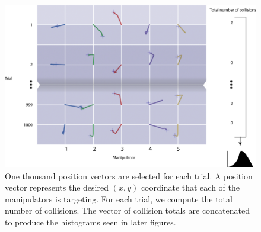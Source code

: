 \documentclass[9pt,twocolumn,twoside]{pnas-new}
\begin{document}
\begin{figure}
\centering
\includegraphics[width=11.4cm]{trial_explanation}
\caption{One thousand position vectors are selected for each trial. A position vector represents the desired $(x,y)$ coordinate that each of the manipulators is targeting. For each trial, we compute the total number of collisions. The vector of collision totals are concatenated to produce the histograms seen in later figures.}\label{fig:intersection}
\end{figure}
\end{document}

